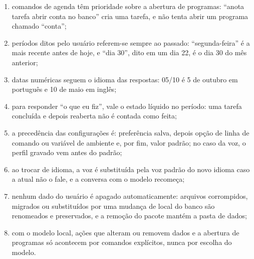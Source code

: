 \begin{enumerate}[label=RN\arabic*:,leftmargin=2.2cm]
  \item comandos de agenda têm prioridade sobre a abertura de programas: “anota tarefa abrir conta no
        banco” cria uma tarefa, e não tenta abrir um programa chamado “conta”;
  \item períodos ditos pelo usuário referem-se sempre ao passado: “segunda-feira” é a mais recente antes
        de hoje, e “dia 30”, dito em um dia 22, é o dia 30 do mês anterior;
  \item datas numéricas seguem o idioma das respostas: 05/10 é 5 de outubro em português e 10 de maio em
        inglês;
  \item para responder “o que eu fiz”, vale o estado líquido no período: uma tarefa concluída e depois
        reaberta não é contada como feita;
  \item a precedência das configurações é: preferência salva, depois opção de linha de comando ou
        variável de ambiente e, por fim, valor padrão; no caso da voz, o perfil gravado vem antes do
        padrão;
  \item ao trocar de idioma, a voz é substituída pela voz padrão do novo idioma caso a atual não o fale,
        e a conversa com o modelo recomeça;
  \item nenhum dado do usuário é apagado automaticamente: arquivos corrompidos, migrados ou substituídos
        por uma mudança de local do banco são renomeados e preservados, e a remoção do pacote mantém a
        pasta de dados;
  \item com o modelo local, ações que alteram ou removem dados e a abertura de programas só acontecem
        por comandos explícitos, nunca por escolha do modelo.
\end{enumerate}
